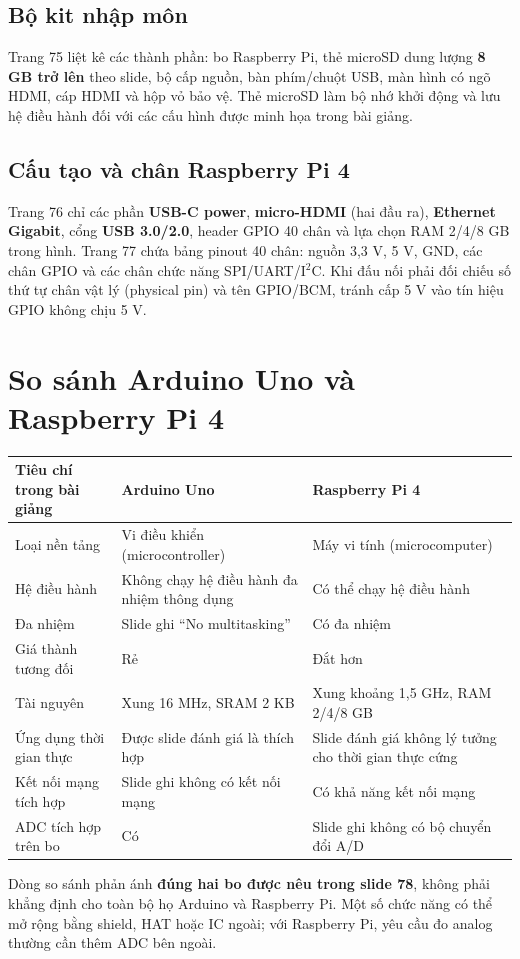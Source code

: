 \subsection{Bộ kit nhập môn}
Trang 75 liệt kê các thành phần: bo Raspberry Pi, thẻ microSD dung lượng \textbf{8 GB trở lên} theo slide, bộ cấp nguồn, bàn phím/chuột USB, màn hình có ngõ HDMI, cáp HDMI và hộp vỏ bảo vệ. Thẻ microSD làm bộ nhớ khởi động và lưu hệ điều hành đối với các cấu hình được minh họa trong bài giảng.
\subsection{Cấu tạo và chân Raspberry Pi 4}
Trang 76 chỉ các phần \textbf{USB-C power}, \textbf{micro-HDMI} (hai đầu ra), \textbf{Ethernet Gigabit}, cổng \textbf{USB 3.0/2.0}, header GPIO 40 chân và lựa chọn RAM 2/4/8 GB trong hình. Trang 77 chứa bảng pinout 40 chân: nguồn 3,3 V, 5 V, GND, các chân GPIO và các chân chức năng SPI/UART/I\(^{2}\)C. Khi đấu nối phải đối chiếu số thứ tự chân vật lý (physical pin) và tên GPIO/BCM, tránh cấp 5 V vào tín hiệu GPIO không chịu 5 V.
\section{So sánh Arduino Uno và Raspberry Pi 4}
\begin{longtable}{p{.38\linewidth}p{.26\linewidth}p{.26\linewidth}}\toprule\textbf{Tiêu chí trong bài giảng} & \textbf{Arduino Uno} & \textbf{Raspberry Pi 4}\\\midrule\endhead
Loại nền tảng & Vi điều khiển (microcontroller) & Máy vi tính (microcomputer)\\
Hệ điều hành & Không chạy hệ điều hành đa nhiệm thông dụng & Có thể chạy hệ điều hành\\
Đa nhiệm & Slide ghi ``No multitasking'' & Có đa nhiệm\\
Giá thành tương đối & Rẻ & Đắt hơn\\
Tài nguyên & Xung 16 MHz, SRAM 2 KB & Xung khoảng 1,5 GHz, RAM 2/4/8 GB\\
Ứng dụng thời gian thực & Được slide đánh giá là thích hợp & Slide đánh giá không lý tưởng cho thời gian thực cứng\\
Kết nối mạng tích hợp & Slide ghi không có kết nối mạng & Có khả năng kết nối mạng\\
ADC tích hợp trên bo & Có & Slide ghi không có bộ chuyển đổi A/D\\\bottomrule\end{longtable}
Dòng so sánh phản ánh \textbf{đúng hai bo được nêu trong slide 78}, không phải khẳng định cho toàn bộ họ Arduino và Raspberry Pi. Một số chức năng có thể mở rộng bằng shield, HAT hoặc IC ngoài; với Raspberry Pi, yêu cầu đo analog thường cần thêm ADC bên ngoài.
